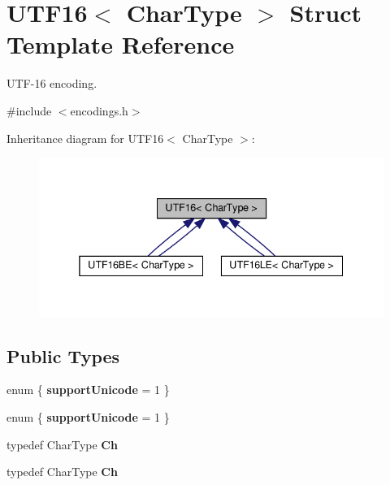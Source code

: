 \hypertarget{structUTF16}{}\section{U\+T\+F16$<$ Char\+Type $>$ Struct Template Reference}
\label{structUTF16}


U\+T\+F-\/16 encoding.  




{\ttfamily \#include $<$encodings.\+h$>$}



Inheritance diagram for U\+T\+F16$<$ Char\+Type $>$\+:
\nopagebreak
\begin{figure}[H]
\begin{center}
\leavevmode
\includegraphics[width=338pt]{structUTF16__inherit__graph}
\end{center}
\end{figure}
\subsection*{Public Types}
\begin{DoxyCompactItemize}
\item 
\mbox{\label{structUTF16_adab5f0f5f81fff0dfc40de4a7990dfef}} 
enum \{ {\bfseries support\+Unicode} = 1
 \}
\item 
\mbox{\label{structUTF16_abfb3e7c410253a0b86a877c3e76b07b1}} 
enum \{ {\bfseries support\+Unicode} = 1
 \}
\item 
\mbox{\label{structUTF16_a811680d50447c98be4fd94c0a27504bb}} 
typedef Char\+Type {\bfseries Ch}
\item 
\mbox{\label{structUTF16_a811680d50447c98be4fd94c0a27504bb}} 
typedef Char\+Type {\bfseries Ch}
\end{DoxyCompactItemize}

